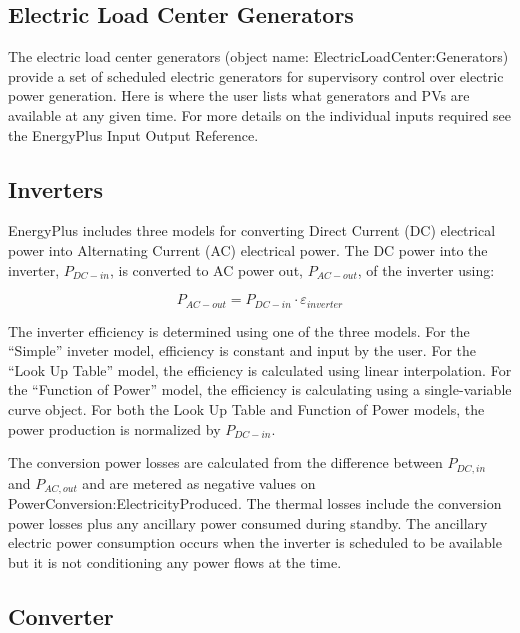 \subsection{Electric Load Center Generators}\label{electric-load-center-generators}

The electric load center generators (object name: ElectricLoadCenter:Generators) provide a set of scheduled electric generators for supervisory control over electric power generation. Here is where the user lists what generators and PVs are available at any given time. For more details on the individual inputs required see the EnergyPlus Input Output Reference.

\subsection{Inverters}\label{inverters}

EnergyPlus includes three models for converting Direct Current (DC) electrical power into Alternating Current (AC) electrical power. The DC power into the inverter, \({P_{DC - in}}\), is converted to AC power out, \({P_{AC - out}}\), of the inverter using:

\begin{equation}
{P_{AC - out}} = {P_{DC - in}} \cdot {\varepsilon_{inverter}}
\end{equation}

The inverter efficiency is determined using one of the three models. For the ``Simple'' inveter model, efficiency is constant and input by the user. For the ``Look Up Table'' model, the efficiency is calculated using linear interpolation. For the ``Function of Power'' model, the efficiency is calculating using a single-variable curve object. For both the Look Up Table and Function of Power models, the power production is normalized by \({P_{DC - in}}\).

The conversion power losses are calculated from the difference between ${P_{DC,in}}$ and ${P_{AC,out}}$ and are metered as negative values on PowerConversion:ElectricityProduced.  The thermal losses include the conversion power losses plus any ancillary power consumed during standby.  The ancillary electric power consumption occurs when the inverter is scheduled to be available but it is not conditioning any power flows at the time. 

\subsection{Converter}

